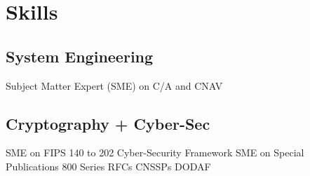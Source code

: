 \documentclass[letterpaper]{deedy-resume} %
\begin{document}
\begin{minipage}[t]{0.33\textwidth}
\sectionspace %


\section{Skills}

\subsection{System Engineering}

Subject Matter Expert (SME) on C/A and CNAV
\sectionspace %
\subsection{Cryptography + Cyber-Sec}
SME on FIPS 140 to 202\textbullet{} Cyber-Security Framework \textbullet{} SME on Special Publications 800 Series \textbullet{} RFCs \textbullet{} CNSSPs \textbullet{} DODAF\\

\sectionspace %


\end{minipage} %
\hfill
%
%
\end{document}
